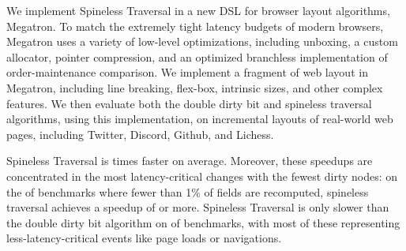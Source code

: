 We implement Spineless Traversal
  in a new DSL for browser layout algorithms, Megatron.
To match the extremely tight latency budgets of modern browsers,
  Megatron uses a variety of low-level optimizations,
  including unboxing, a custom allocator, pointer compression,
  and an optimized branchless implementation
  of order-maintenance comparison.
We implement a fragment of web layout in Megatron,
  including line breaking, flex-box, intrinsic sizes,
  and other complex features.
We then evaluate both the double dirty bit
  and spineless traversal algorithms, using this implementation,
  on \TotalDiffCount incremental layouts
  of \TotalTraceCount real-world web pages,
  including Twitter, Discord, Github, and Lichess.

Spineless Traversal is \DBPQoverhead times faster on average.
Moreover, these speedups are concentrated in
  the most latency-critical changes
  with the fewest dirty nodes:
  on the \PctSmall of benchmarks
  where fewer than 1\% of fields are recomputed,
  spineless traversal achieves a speedup
  of \MeanSpeedupSmall or more.
Spineless Traversal is only slower than the double dirty bit algorithm
  on \PctSlower of benchmarks,
  with most of these representing less-latency-critical events
  like page loads or navigations.